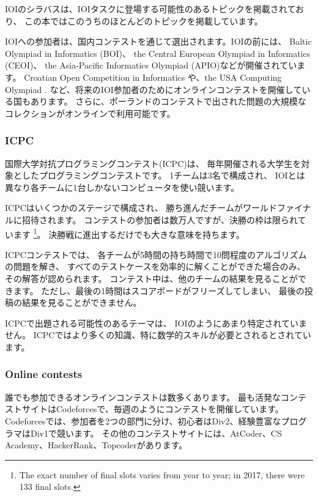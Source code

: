 IOIのシラバス\cite{iois}は、IOIタスクに登場する可能性のあるトピックを掲載されており、
この本ではこのうちのほとんどのトピックを掲載しています。

IOIへの参加者は、国内コンテストを通じて選出されます。IOIの前には、
Baltic Olympiad in Informatics (BOI)、
the Central European Olympiad in Informatics (CEOI)、
the Asia-Pacific Informatics Olympiad (APIO)などが開催されています。
Croatian Open Competition in Informatics \cite{coci}
や、the USA Computing Olympiad \cite{usaco}.
など、将来のIOI参加者のためにオンラインコンテストを開催している国もあります。
さらに、ポーランドのコンテストで出された問題の大規模な
コレクションがオンラインで利用可能です\cite{main}。

\subsubsection{ICPC}

国際大学対抗プログラミングコンテスト(ICPC)は、
毎年開催される大学生を対象としたプログラミングコンテストです。
1チームは3名で構成され、
IOIとは異なり各チームに1台しかないコンピュータを使い競います。

ICPCはいくつかのステージで構成され、
勝ち進んだチームがワールドファイナルに招待されます。
コンテストの参加者は数万人ですが、決勝の枠は限られています
\footnote{The exact number of final
slots varies from year to year; in 2017, there were 133 final slots.}。
決勝戦に進出するだけでも大きな意味を持ちます。

ICPCコンテストでは、
各チームが5時間の持ち時間で10問程度のアルゴリズムの問題を解き、
すべてのテストケースを効率的に解くことができた場合のみ、その解答が認められます。
コンテスト中は、他のチームの結果を見ることができます。
ただし、最後の1時間はスコアボードがフリーズしてしまい、 最後の投稿の結果を見ることができません。

ICPCで出題される可能性のあるテーマは、
IOIのようにあまり特定されていません。
ICPCではより多くの知識、特に数学的スキルが必要とされるとされています。

\subsubsection{Online contests}

誰でも参加できるオンラインコンテストは数多くあります。
最も活発なコンテストサイトはCodeforcesで、毎週のようにコンテストを開催しています。
Codeforcesでは、参加者を2つの部門に分け、初心者はDiv2、経験豊富なプログラマはDiv1で競います。
その他のコンテストサイトには、AtCoder、CS Academy、HackerRank、Topcoderがあります。

